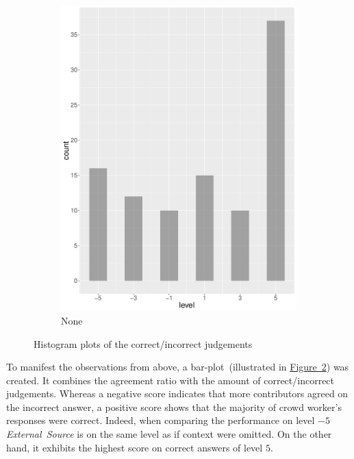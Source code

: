 \begin{figure}
\begin{subfigure}[b]{0.4\textwidth}
        \includegraphics[width=\textwidth]{plots/climate_change/hist_level_none}
        \caption{None}
        \label{fig:hist_level_none}
    \end{subfigure}
    \caption{Histogram plots of the correct/incorrect judgements}\label{fig:hist_level_all}
\end{figure}

To manifest the observations from above, a bar-plot~(illustrated in \hyperref[fig:hist_level_all]{Figure~\ref*{fig:hist_level_all}}) was created. It combines the agreement ratio with the amount of correct/incorrect judgements. Whereas a negative score indicates that more contributors agreed on the incorrect answer, a positive score shows that the majority of crowd worker's responses were correct. Indeed, when comparing the performance on level $-5$ \emph{External~Source} is on the same level as if context were omitted. On the other hand, it exhibits the highest score on correct answers of level $5$.

